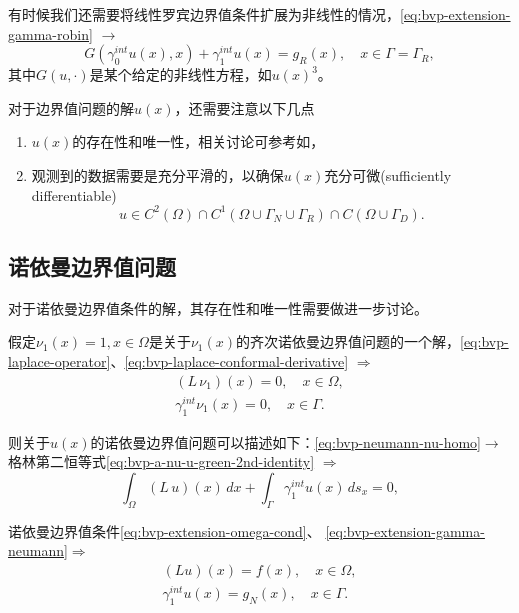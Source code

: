 有时候我们还需要将线性罗宾边界值条件扩展为非线性的情况，\eqref{eq:bvp-extension-gamma-robin} $\rightarrow$
\begin{equation}
  \label{eq:bvp-extension-gamma-robin-nonlinear}
  G\left( \gamma_0^{int} u(x), x \right) + \gamma_1^{int} u(x) = g_R(x), \quad x \in \Gamma = \Gamma_R,
\end{equation}
其中$G(u,\cdot)$是某个给定的非线性方程，如$u(x)^3$。

对于边界值问题的解$u(x)$，还需要注意以下几点
\begin{enumerate}
  \item $u(x)$的存在性和唯一性，相关讨论可参考如\cite{Ladyzhenskaya:1968vq}，
  \item 观测到的数据需要是充分平滑的，以确保$u(x)$充分可微(sufficiently differentiable)
  \begin{equation*}
    u \in C^2(\Omega) \cap C^1 \left( \Omega \cup \Gamma_N \cup \Gamma_R \right) \cap C(\Omega \cup \Gamma_D).
  \end{equation*}
\end{enumerate}

\subsection{诺依曼边界值问题}
对于诺依曼边界值条件的解，其存在性和唯一性需要做进一步讨论。

假定$\nu_1(x)=1, x \in \Omega$是关于$\nu_1(x)$的齐次诺依曼边界值问题的一个解，\eqref{eq:bvp-laplace-operator}、\eqref{eq:bvp-laplace-conformal-derivative} $\Rightarrow$
\begin{equation}
  \label{eq:bvp-neumann-nu-homo}
  \begin{split}
    \left( L \, \nu_1 \right)(x)=0, \quad x \in \Omega,\\
    \gamma_1^{int} \nu_1(x) = 0, \quad x \in \Gamma.
  \end{split}
\end{equation}

则关于$u(x)$的诺依曼边界值问题可以描述如下：\eqref{eq:bvp-neumann-nu-homo}$\rightarrow$格林第二恒等式\eqref{eq:bvp-a-nu-u-green-2nd-identity} $\Rightarrow$
\begin{equation}
  \label{eq:bvp-neumann-green-2}
  \int_{\Omega} \left( L \, u \right)(x) \, dx + \int_{\Gamma} \gamma_1^{int} u(x) \, d s_x = 0,
\end{equation}

诺依曼边界值条件\eqref{eq:bvp-extension-omega-cond}、 \eqref{eq:bvp-extension-gamma-neumann}$\Rightarrow$
\begin{equation}
  \label{eq:bvp-neumann-cond}
\begin{split}
  \left( L u \right)(x) = f(x), \quad x \in \Omega, \\
  \gamma_1^{int} u(x) = g_N(x), \quad x \in \Gamma.
\end{split}
\end{equation}

